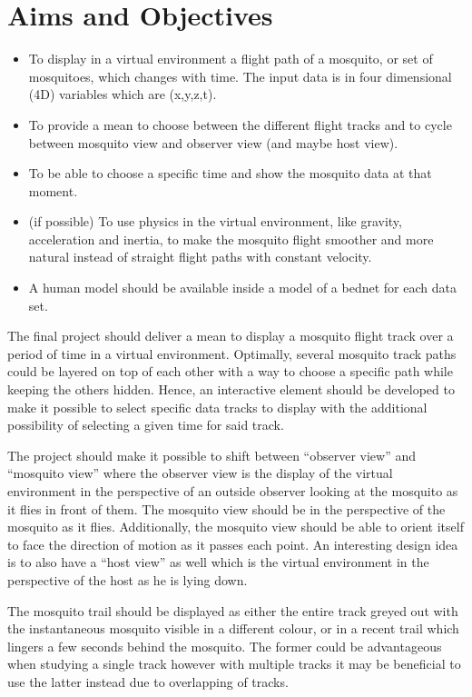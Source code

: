 \section{Aims and Objectives}
\begin{itemize}
    \item To display in a virtual environment a flight path of a mosquito, or set of mosquitoes, which changes with time. The input data is in four dimensional (4D) variables which are (x,y,z,t).
    \item To provide a mean to choose between the different flight tracks and to cycle between mosquito view and observer view (and maybe host view).
    \item To be able to choose a specific time and show the mosquito data at that moment.
    \item (if possible) To use physics in the virtual environment, like gravity, acceleration and inertia, to make the mosquito flight smoother and more natural instead of straight flight paths with constant velocity.
    \item A human model should be available inside a model of a bednet for each data set.
\end{itemize}

The final project should deliver a mean to display a mosquito flight track over a period of time in a virtual environment. Optimally, several mosquito track paths could be layered on top of each other with a way to choose a specific path while keeping the others hidden. Hence, an interactive element should be developed to make it possible to select specific data tracks to display with the additional possibility of selecting a given time for said track.

The project should make it possible to shift between ``observer view'' and ``mosquito view'' where the observer view is the display of the virtual environment in the perspective of an outside observer looking at the mosquito as it flies in front of them. The mosquito view should be in the perspective of the mosquito as it flies. Additionally, the mosquito view should be able to orient itself to face the direction of motion as it passes each point. An interesting  design idea is to also have a ``host view'' as well which is the virtual environment in the perspective of the host as he is lying down. 

The mosquito trail should be displayed as either the entire track greyed out with the instantaneous mosquito visible in a different colour, or in a recent trail which lingers a few seconds behind the mosquito. The former could be advantageous when studying a single track however with multiple tracks it may be beneficial to use the latter instead due to overlapping of tracks. 


